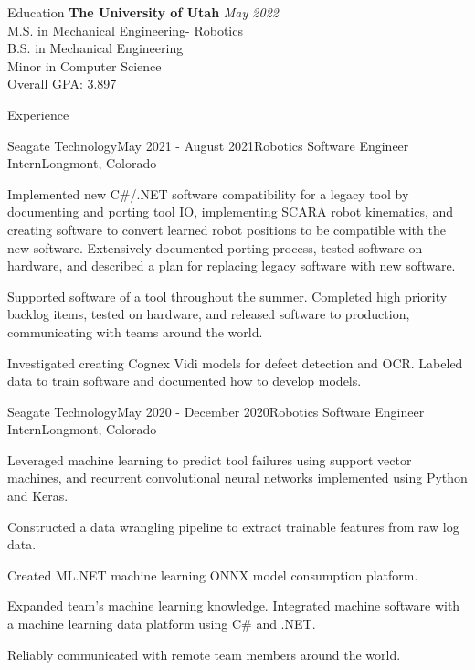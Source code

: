 \documentclass{resume}
\begin{document}
  \begin{rSection}{Education}
    {\bf The University of Utah} \hfill {\em May 2022} \\ 
    { M.S. in Mechanical Engineering- Robotics } \\
    { B.S. in Mechanical Engineering } \\
    { Minor in Computer Science } \smallskip \\
    Overall GPA: 3.897 
  \end{rSection}
  
  \begin{rSection}{Experience}
  
    \begin{rSubsection}{Seagate Technology}{May 2021 - August 2021}{Robotics Software Engineer Intern}{Longmont, Colorado}
    \item Implemented new C\#/.NET software compatibility for a legacy tool by documenting and porting tool IO, implementing SCARA robot kinematics, and creating software to convert learned robot positions to be compatible with the new software. 
    Extensively documented porting process, tested software on hardware, and described a plan for replacing legacy software with new software. 
    \item Supported software of a tool throughout the summer. Completed high priority backlog items, tested on hardware, and released software to production, communicating with teams around the world.
    \item Investigated creating Cognex Vidi models for defect detection and OCR. Labeled data to train software and documented how to develop models.
    \end{rSubsection}
  
    \begin{rSubsection}{Seagate Technology}{May 2020 - December 2020}{Robotics Software Engineer Intern}{Longmont, Colorado}
    \item Leveraged machine learning to predict tool failures using support vector machines, and recurrent convolutional neural networks implemented using Python and Keras. 
    \item Constructed a data wrangling pipeline to extract trainable features from raw log data. 
    \item Created ML.NET machine learning ONNX model consumption platform.
    \item Expanded team’s machine learning knowledge. Integrated machine software with a machine learning data platform using C\# and .NET.
    \item Reliably communicated with remote team members around the world.
    \end{rSubsection}


\end{rSection}
\end{document}
